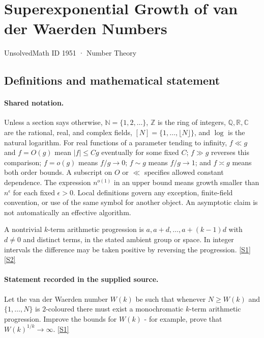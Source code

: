 \documentclass[11pt,a4paper]{article}
\newcommand{\N}{\mathbb{N}}
\newcommand{\Z}{\mathbb{Z}}
\newcommand{\Q}{\mathbb{Q}}
\newcommand{\R}{\mathbb{R}}
\newcommand{\C}{\mathbb{C}}
\newcommand{\sref}[2]{\hyperlink{source:#1:#2}{[S#2]}}
\begin{document}

\setcounter{section}{1950}

\section{Superexponential Growth of van der Waerden Numbers}\label{1951}

{\small\sffamily UnsolvedMath ID 1951 · Number Theory}

\subsection{Definitions and mathematical statement}

\paragraph{Shared notation.}Unless a section says otherwise, $\N=\{1,2,\ldots\}$,
$\Z$ is the ring of integers, $\Q,\R,\C$ are the rational, real, and complex
fields, $[N]=\{1,\ldots,\lfloor N\rfloor\}$, and $\log$ is the natural
logarithm. For real functions of a parameter tending to infinity,
$f\ll g$ and $f=O(g)$ mean $|f|\leq Cg$ eventually for some fixed $C$;
$f\gg g$ reverses this comparison; $f=o(g)$ means $f/g\to0$;
$f\sim g$ means $f/g\to1$; and $f\asymp g$ means both order bounds.
A subscript on $O$ or $\ll$ specifies allowed constant dependence.
The expression $n^{o(1)}$ in an upper bound means growth smaller than
$n^\epsilon$ for each fixed $\epsilon>0$. Local definitions govern any
exception, finite-field convention, or use of the same symbol for another
object. An asymptotic claim is not automatically an effective algorithm.



A nontrivial $k$-term arithmetic progression is $a,a+d,\ldots,a+(k-1)d$ with $d\ne0$ and distinct terms, in the stated ambient group or space. In integer intervals the difference may be taken positive by reversing the progression. \sref{1951}{1} \sref{1951}{2}

\paragraph{Statement recorded in the supplied source.}
Let the van der Waerden number $W(k)$ be such that whenever $N\geq W(k)$ and $\{1,\ldots,N\}$ is $2$-coloured there must exist a monochromatic $k$-term arithmetic progression. Improve the bounds for $W(k)$ - for example, prove that $W(k)^{1/k}\to \infty$. \sref{1951}{1}
\end{document}
